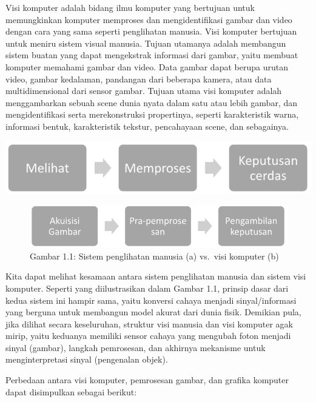 \documentclass[
  letterpaper,
  DIV=11,
  numbers=noendperiod]{scrreprt}
\begin{document}

Visi komputer adalah bidang ilmu komputer yang bertujuan untuk
memungkinkan komputer memproses dan mengidentifikasi gambar dan video
dengan cara yang sama seperti penglihatan manusia. Visi komputer
bertujuan untuk meniru sistem visual manusia. Tujuan utamanya adalah
membangun sistem buatan yang dapat mengekstrak informasi dari gambar,
yaitu membuat komputer memahami gambar dan video. Data gambar dapat
berupa urutan video, gambar kedalaman, pandangan dari beberapa kamera,
atau data multidimensional dari sensor gambar. Tujuan utama visi
komputer adalah menggambarkan sebuah scene dunia nyata dalam satu atau
lebih gambar, dan mengidentifikasi serta merekonstruksi propertinya,
seperti karakteristik warna, informasi bentuk, karakteristik tekstur,
pencahayaan scene, dan sebagainya.

\includegraphics{Asset/image1.png}

\begin{figure}

{\centering \includegraphics{Asset/image2.png}

}

\caption{Gambar 1.1: Sistem penglihatan manusia (a) vs.~visi komputer
(b)}

\end{figure}

Kita dapat melihat kesamaan antara sistem penglihatan manusia dan sistem
visi komputer. Seperti yang diilustrasikan dalam Gambar 1.1, prinsip
dasar dari kedua sistem ini hampir sama, yaitu konversi cahaya menjadi
sinyal/informasi yang berguna untuk membangun model akurat dari dunia
fisik. Demikian pula, jika dilihat secara keseluruhan, struktur visi
manusia dan visi komputer agak mirip, yaitu keduanya memiliki sensor
cahaya yang mengubah foton menjadi sinyal (gambar), langkah pemrosesan,
dan akhirnya mekanisme untuk menginterpretasi sinyal (pengenalan objek).

Perbedaan antara visi komputer, pemrosesan gambar, dan grafika komputer
dapat disimpulkan sebagai berikut:
\end{document}
